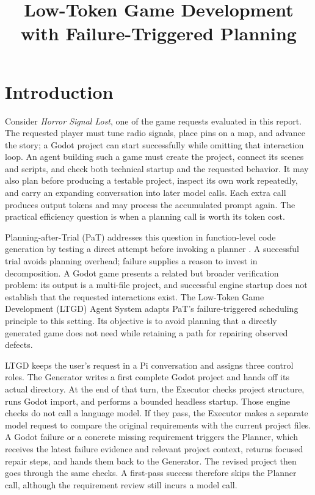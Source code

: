 \documentclass[11pt]{article}
\title{Low-Token Game Development with Failure-Triggered Planning}
\author{}
\date{}
\begin{document}
\maketitle

\section{Introduction}

Consider \emph{Horror Signal Lost}, one of the game requests evaluated in this report. The requested player must tune radio signals, place pins on a map, and advance the story; a Godot project can start successfully while omitting that interaction loop. An agent building such a game must create the project, connect its scenes and scripts, and check both technical startup and the requested behavior. It may also plan before producing a testable project, inspect its own work repeatedly, and carry an expanding conversation into later model calls. Each extra call produces output tokens and may process the accumulated prompt again. The practical efficiency question is when a planning call is worth its token cost.

Planning-after-Trial (PaT) addresses this question in function-level code generation by testing a direct attempt before invoking a planner \cite{yoon2026pat}. A successful trial avoids planning overhead; failure supplies a reason to invest in decomposition. A Godot game presents a related but broader verification problem: its output is a multi-file project, and successful engine startup does not establish that the requested interactions exist. The Low-Token Game Development (LTGD) Agent System adapts PaT's failure-triggered scheduling principle to this setting. Its objective is to avoid planning that a directly generated game does not need while retaining a path for repairing observed defects.

LTGD keeps the user's request in a Pi conversation and assigns three control roles. The Generator writes a first complete Godot project and hands off its actual directory. At the end of that turn, the Executor checks project structure, runs Godot import, and performs a bounded headless startup. Those engine checks do not call a language model. If they pass, the Executor makes a separate model request to compare the original requirements with the current project files. A Godot failure or a concrete missing requirement triggers the Planner, which receives the latest failure evidence and relevant project context, returns focused repair steps, and hands them back to the Generator. The revised project then goes through the same checks. A first-pass success therefore skips the Planner call, although the requirement review still incurs a model call.
\end{document}
